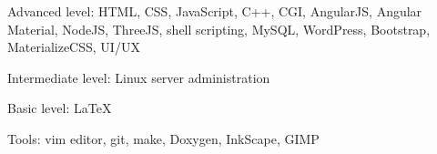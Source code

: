 \cventry{}
    {Advanced level:}
    {}
    {HTML, CSS, JavaScript, C++, CGI, AngularJS, Angular Material, NodeJS, ThreeJS, shell scripting, MySQL, WordPress, Bootstrap, MaterializeCSS, UI/UX}
    {}
    {}

\cventry{}
    {Intermediate level:}
    {}
    {Linux server administration}
    {}
    {}

\cventry{}
    {Basic level:}
    {}
    {\LaTeX}
    {}
    {}

\cventry{}
    {Tools:}
    {}
    {vim editor, git, make, Doxygen, InkScape, GIMP}
    {}
    {}
